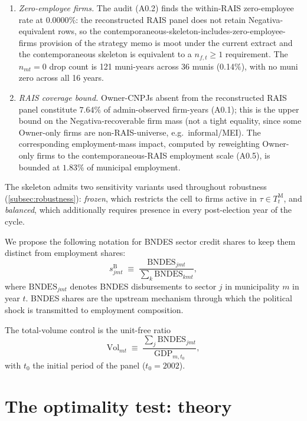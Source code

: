 \documentclass{article}
\newcommand{\Vol}{\mathrm{Vol}}
\theoremstyle{plain}
\theoremstyle{definition}
\theoremstyle{remark}
\begin{document}
\begin{enumerate}[leftmargin=*,nosep]
\item \emph{Zero-employee firms.} The audit (A0.2) finds the within-RAIS
zero-employee rate at $0.0000\%$: the reconstructed RAIS panel does not retain
Negativa-equivalent rows, so the contemporaneous-skeleton-includes-zero-employee-firms
provision of the strategy memo is moot under the current extract and the
contemporaneous skeleton is equivalent to a $n_{f,t}\geq 1$ requirement. The
$n_{mt}=0$ drop count is 121 muni-years across 36 munis (0.14\%), with no muni
zero across all 16 years.
\item \emph{RAIS coverage bound.} Owner-CNPJs absent from the reconstructed
RAIS panel constitute $7.64\%$ of admin-observed firm-years (A0.1); this is
the upper bound on the Negativa-recoverable firm mass (not a tight equality,
since some Owner-only firms are non-RAIS-universe, e.g.\ informal/MEI). The
corresponding employment-mass impact, computed by reweighting Owner-only
firms to the contemporaneous-RAIS employment scale (A0.5), is bounded at
$1.83\%$ of municipal employment.
\end{enumerate}
The skeleton admits two sensitivity variants used throughout robustness
(\autoref{subsec:robustness}): \emph{frozen}, which restricts the cell to
firms active in $\tau\in T^{\mathrm{M}}_t$, and \emph{balanced}, which
additionally requires presence in every post-election year of the cycle.

We propose the following notation for BNDES sector credit shares to keep them
distinct from employment shares:
\begin{equation}\label{eq:bndes-share-notation}
  s^{\mathrm{B}}_{jmt}
  \;\equiv\;
  \frac{\mathrm{BNDES}_{jmt}}{\sum_{k}\mathrm{BNDES}_{kmt}},
\end{equation}
where $\mathrm{BNDES}_{jmt}$ denotes BNDES disbursements to sector $j$ in
municipality $m$ in year $t$. BNDES shares are the upstream mechanism through which the political
shock is transmitted to employment composition.

The total-volume control is the unit-free ratio
\begin{equation}\label{eq:vol}
  \Vol_{mt} \;\equiv\;
  \frac{\sum_{j} \mathrm{BNDES}_{jmt}}{\mathrm{GDP}_{m,t_0}},
\end{equation}
with $t_0$ the initial period of the panel ($t_0=2002$).

\section{The optimality test: theory}\label{sec:theory}
\end{document}
